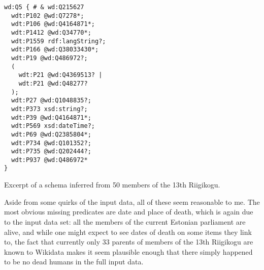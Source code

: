 \begin{lstfloat}[t]
\begin{lstlisting}[language=sparql]
wd:Q5 { # & wd:Q215627
  wdt:P102 @wd:Q7278*;
  wdt:P106 @wd:Q4164871*;
  wdt:P1412 @wd:Q34770*;
  wdt:P1559 rdf:langString?;
  wdt:P166 @wd:Q38033430*;
  wdt:P19 @wd:Q486972?;
  (
    wdt:P21 @wd:Q4369513? |
    wdt:P21 @wd:Q48277?
  );
  wdt:P27 @wd:Q1048835?;
  wdt:P373 xsd:string?;
  wdt:P39 @wd:Q4164871*;
  wdt:P569 xsd:dateTime?;
  wdt:P69 @wd:Q2385804*;
  wdt:P734 @wd:Q101352?;
  wdt:P735 @wd:Q202444?;
  wdt:P937 @wd:Q486972*
}
\end{lstlisting}
\caption{Excerpt of a \gls{schema} inferred from 50 members of the 13th Riigikogu.}
\label{listing:13th-riigikogu-Q5}
\end{lstfloat}

Aside from some quirks of the input data, all of these seem reasonable to me.
The most obvious missing \glspl{predicate} are date and place of death,
which is again due to the input data set:
all the members of the current Estonian parliament are alive,
and while one might expect to see dates of death on some \glspl{item} they link to,
the fact that currently only 33 parents of members of the 13th Riigikogu are known to \gls{Wikidata}
makes it seem plausible enough that there simply happened to be no dead humans in the full input data.

